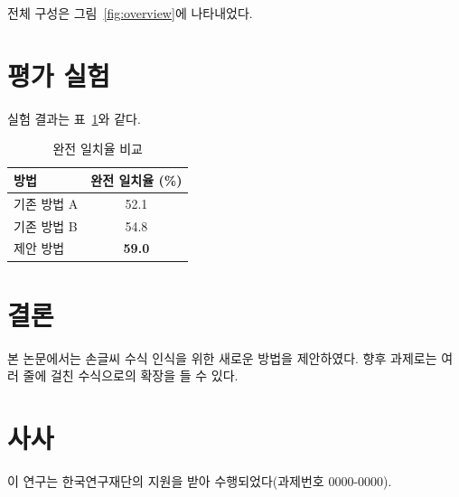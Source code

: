 \documentclass[a4paper,11pt]{article}
\begin{document}
전체 구성은 그림~\ref{fig:overview}에 나타내었다.

\section{평가 실험}
실험 결과는 표~\ref{tab:result}와 같다.

\begin{table}[tb]
  \centering
  \caption{완전 일치율 비교}
  \label{tab:result}
  \begin{tabular}{lc}
    \toprule
    방법 & 완전 일치율 (\%) \\
    \midrule
    기존 방법 A & 52.1 \\
    기존 방법 B & 54.8 \\
    제안 방법   & \textbf{59.0} \\
    \bottomrule
  \end{tabular}
\end{table}

\section{결론}
본 논문에서는 손글씨 수식 인식을 위한 새로운 방법을 제안하였다.
향후 과제로는 여러 줄에 걸친 수식으로의 확장을 들 수 있다.

\section*{사사}
이 연구는 한국연구재단의 지원을 받아 수행되었다(과제번호 0000-0000).



\end{document}
